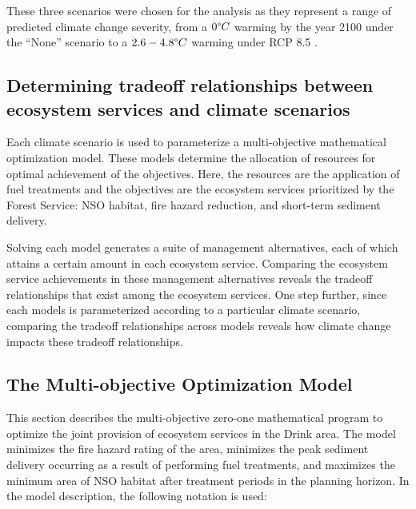 These three scenarios were chosen for the analysis as they represent a range of predicted climate change severity, from a $0 \degree C$ warming by the year 2100 under the ``None'' scenario to a $2.6-4.8 \degree C$ warming under RCP 8.5 \cite{ipcc2013climate}.

\subsection{Determining tradeoff relationships between ecosystem services and climate scenarios}
\label{subsec:whyUsingMultiObjModel}
Each climate scenario is used to parameterize a multi-objective mathematical optimization model. These models determine the allocation of resources for optimal achievement of the objectives. Here, the resources are the application of fuel treatments and the objectives are the ecosystem services prioritized by the Forest Service: NSO habitat, fire hazard reduction, and short-term sediment delivery.

Solving each model generates a suite of management alternatives, each of which attains a certain amount in each ecosystem service. Comparing the ecosystem service achievements in these management alternatives reveals the tradeoff relationships that exist among the ecosystem services. One step further, since each models is parameterized according to a particular climate scenario, comparing the tradeoff relationships across models reveals how climate change impacts these tradeoff relationships.

\subsection{The Multi-objective Optimization Model}
This section describes the multi-objective zero-one mathematical program to optimize the joint provision of ecosystem services in the Drink area. The model minimizes the fire hazard rating of the area, minimizes the peak sediment delivery occurring as a result of performing fuel treatments, and maximizes the minimum area of NSO habitat after treatment periods in the planning horizon. In the model description, the following notation is used:
